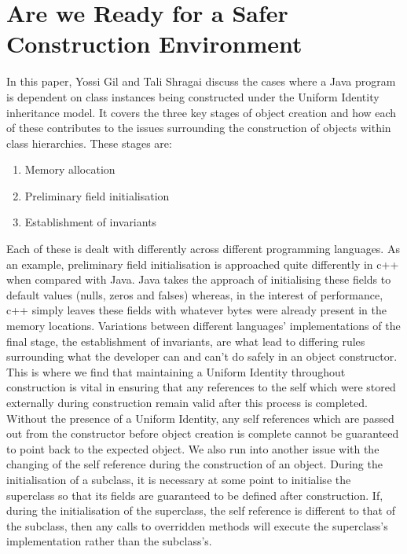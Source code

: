 \section{Are we Ready for a Safer Construction Environment~\cite{SaferConstruction}}
In this paper, Yossi Gil and Tali Shragai discuss the cases where a Java program is dependent on class instances being constructed under the Uniform Identity inheritance model. It covers the three key stages of object creation and how each of these contributes to the issues surrounding the construction of objects within class hierarchies. These stages are:
\begin{enumerate}
	\item Memory allocation
	\item Preliminary field initialisation
	\item Establishment of invariants
\end{enumerate}
Each of these is dealt with differently across different programming languages. As an example, preliminary field initialisation is approached quite differently in c++ when compared with Java. Java takes the approach of initialising these fields to default values (nulls, zeros and falses) whereas, in the interest of performance, c++ simply leaves these fields with whatever bytes were already present in the memory locations. \newline
Variations between different languages’ implementations of the final stage, the establishment of invariants, are what lead to differing rules surrounding what the developer can and can’t do safely in an object constructor. This is where we find that maintaining a Uniform Identity throughout construction is vital in ensuring that any references to the self which were stored externally during construction remain valid after this process is completed. Without the presence of a Uniform Identity, any self references which are passed out from the constructor before object creation is complete cannot be guaranteed to point back to the expected object. \newline
We also run into another issue with the changing of the self reference during the construction of an object. During the initialisation of a subclass, it is necessary at some point to initialise the superclass so that its fields are guaranteed to be defined after construction. If, during the initialisation of the superclass, the self reference is different to that of the subclass, then any calls to overridden methods will execute the superclass's implementation rather than the subclass's.

